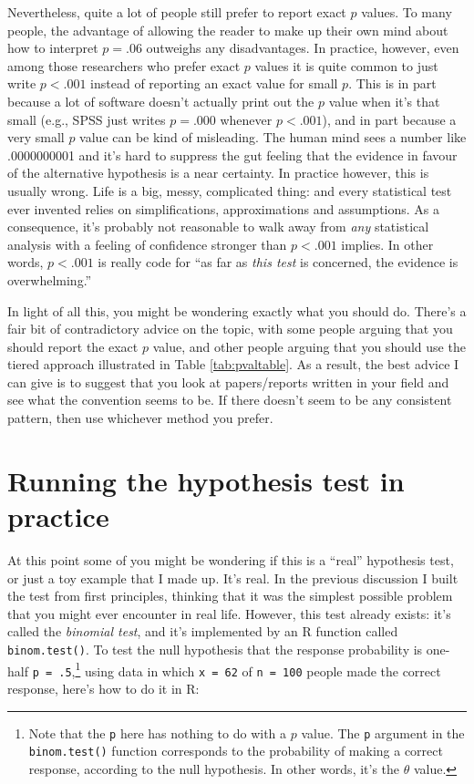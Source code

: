 \documentclass[
]{book}
\begin{document}
Nevertheless, quite a lot of people still prefer to report exact \(p\) values. To many people, the advantage of allowing the reader to make up their own mind about how to interpret \(p = .06\) outweighs any disadvantages. In practice, however, even among those researchers who prefer exact \(p\) values it is quite common to just write \(p<.001\) instead of reporting an exact value for small \(p\). This is in part because a lot of software doesn't actually print out the \(p\) value when it's that small (e.g., SPSS just writes \(p = .000\) whenever \(p<.001\)), and in part because a very small \(p\) value can be kind of misleading. The human mind sees a number like .0000000001 and it's hard to suppress the gut feeling that the evidence in favour of the alternative hypothesis is a near certainty. In practice however, this is usually wrong. Life is a big, messy, complicated thing: and every statistical test ever invented relies on simplifications, approximations and assumptions. As a consequence, it's probably not reasonable to walk away from \emph{any} statistical analysis with a feeling of confidence stronger than \(p<.001\) implies. In other words, \(p<.001\) is really code for ``as far as \emph{this test} is concerned, the evidence is overwhelming.''

In light of all this, you might be wondering exactly what you should do. There's a fair bit of contradictory advice on the topic, with some people arguing that you should report the exact \(p\) value, and other people arguing that you should use the tiered approach illustrated in Table \ref{tab:pvaltable}. As a result, the best advice I can give is to suggest that you look at papers/reports written in your field and see what the convention seems to be. If there doesn't seem to be any consistent pattern, then use whichever method you prefer.

\hypertarget{running-the-hypothesis-test-in-practice}{%
\section{Running the hypothesis test in practice}\label{running-the-hypothesis-test-in-practice}}

At this point some of you might be wondering if this is a ``real'' hypothesis test, or just a toy example that I made up. It's real. In the previous discussion I built the test from first principles, thinking that it was the simplest possible problem that you might ever encounter in real life. However, this test already exists: it's called the \emph{binomial test}, and it's implemented by an R function called \texttt{binom.test()}. To test the null hypothesis that the response probability is one-half \texttt{p\ =\ .5},\footnote{Note that the \texttt{p} here has nothing to do with a \(p\) value. The \texttt{p} argument in the \texttt{binom.test()} function corresponds to the probability of making a correct response, according to the null hypothesis. In other words, it's the \(\theta\) value.} using data in which \texttt{x\ =\ 62} of \texttt{n\ =\ 100} people made the correct response, here's how to do it in R:
\end{document}
